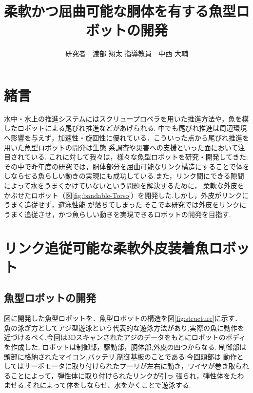 \documentclass{jarticle}
\begin{document}

\title{
柔軟かつ屈曲可能な胴体を有する魚型ロボットの開発
}
\author{
研究者　渡部 翔太\;\;\;
指導教員　中西 大輔
}

\maketitle

\thispagestyle{empty}  %

\section{緒言}
水中・水上の推進システムにはスクリュープロペラを用いた推進方法や，魚を模したロボットによる尾びれ推進などがあげられる\cite{ichi}.
中でも尾びれ推進は周辺環境へ影響を与えず，加速性・旋回性に優れている．こういった点から尾びれ推進を用いた魚型ロボットの開発は生態
系調査や災害への支援といった面において注目されている\cite{ni}.
これに対して我々は，様々な魚型ロボットを研究・開発してきた.その中で昨年度の研究では，胴体部分を屈曲可能なリンク構造にすることで体を
しならせる魚らしい動きの実現にも成功している.また，リンク間にできる隙間によって水をうまくかけていないという問題を解決するために，
柔軟な外皮をかぶせたロボット（図\ref{fig:bandable-Torso}）を開発した\cite{san}.しかし，外皮がリンクにうまく追従せず，遊泳性能
が落ちてしまった.そこで本研究では外皮をリンクにうまく追従させ，かつ魚らしい動きを実現できるロボットの開発を目指す.


\section{リンク追従可能な柔軟外皮装着魚ロボット}
\subsection{魚型ロボットの開発}
図に開発した魚型ロボットを．魚型ロボットの構造を図\ref{fig:structure}に示す．
魚の泳ぎ方としてアジ型遊泳という代表的な遊泳方法があり,実際の魚に動作を近づけるべく,今回は3Dスキャンされたアジのデータをもとにロボットのボディを作成した.
ロボットは制御部，駆動部，胴体部,外皮の四つからなる.
制御部は頭部に格納されたマイコン,バッテリ,制御基板のことである.今回頭部は
動作としてはサーボモータに取り付けられたプーリが左右に動き，ワイヤが巻き取られることによって，弾性体に取り付けられたリンクが引っ
張られ，弾性体をたわませる.それによって体をしならせ、水をかくことで遊泳する.
\end{document}
